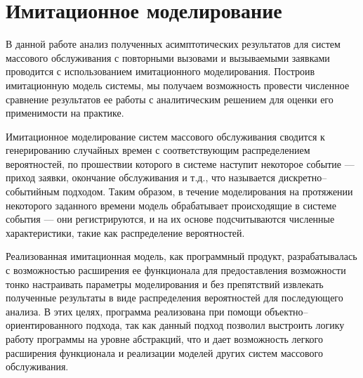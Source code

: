 \section{Имитационное моделирование}
В данной работе анализ полученных асимптотических результатов для систем массового обслуживания с повторными вызовами и вызываемыми заявками проводится с использованием имитационного моделирования. Построив имитационную модель системы, мы получаем возможность провести численное сравнение результатов ее работы с аналитическим решением для оценки его применимости на практике.

Имитационное моделирование систем массового обслуживания \cite{wieland2003queueing} сводится к генерированию случайных времен с соответствующим распределением вероятностей, по прошествии которого в системе наступит некоторое событие --- приход заявки, окончание обслуживания и т.д., что называется дискретно--событийным подходом. Таким образом, в течение моделирования на протяжении некоторого заданного времени модель обрабатывает происходящие в системе события --- они регистрируются, и на их основе подсчитываются численные характеристики, такие как распределение вероятностей.

Реализованная имитационная модель, как программный продукт, разрабатывалась с возможностью расширения ее функционала для предоставления возможности тонко настраивать параметры моделирования и без препятствий извлекать полученные результаты в виде распределения вероятностей для последующего анализа. В этих целях, программа реализована при помощи объектно--ориентированного подхода, так как данный подход позволил выстроить логику работу программы на уровне абстракций, что и дает возможность легкого расширения функционала и реализации моделей других систем массового обслуживания.

